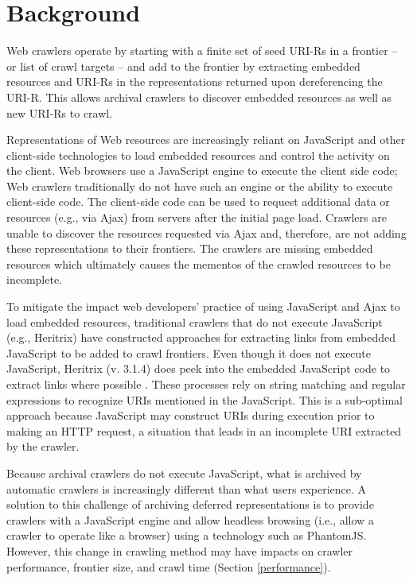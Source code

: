 \documentclass{ipres_proc_article-sp}
\begin{document}
\section{Background}
\label{backgroung}
Web crawlers operate by starting with a finite set of seed URI-Rs in a frontier -- or list of crawl targets -- and add to the frontier by extracting embedded resources and URI-Rs in the representations returned upon dereferencing the URI-R. This allows archival crawlers to discover embedded resources as well as new URI-Rs to crawl.

Representations of Web resources are increasingly reliant on JavaScript and other client-side technologies to load embedded resources and control the activity on the client. Web browsers use a JavaScript engine to execute the client side code; Web crawlers traditionally do not have such an engine or the ability to execute client-side code. The client-side code can be used to request additional data or resources (e.g., via Ajax) from servers after the initial page load. Crawlers are unable to discover the resources requested via Ajax and, therefore, are not adding these representations to their frontiers. The crawlers are missing embedded resources which ultimately causes the mementos of the crawled resources to be incomplete. 

To mitigate the impact web developers' practice of using JavaScript and Ajax to load embedded resources, traditional crawlers that do not execute JavaScript (e.g., Heritrix) have constructed approaches for extracting links from embedded JavaScript to be added to crawl frontiers. Even though it does not execute JavaScript, Heritrix (v. 3.1.4) does peek into the embedded JavaScript code to extract links where possible \cite{htrixJS}. These processes rely on string matching and regular expressions to recognize URIs mentioned in the JavaScript. This is a sub-optimal approach because JavaScript may construct URIs during execution prior to making an HTTP request, a situation that leads in an incomplete URI extracted by the crawler.  

Because archival crawlers do not execute JavaScript, what is archived by automatic crawlers is increasingly different than what users experience. A solution to this challenge of archiving deferred representations is to provide crawlers with a JavaScript engine and allow headless browsing (i.e., allow a crawler to operate like a browser) using a technology such as PhantomJS. However, this change in crawling method may have impacts on crawler performance, frontier size, and crawl time (Section \ref{performance}).
\end{document}
